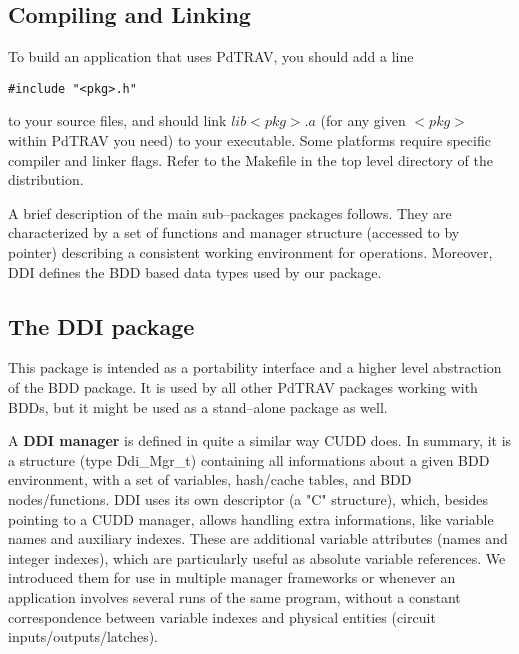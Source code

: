 \subsection{Compiling and Linking}
 
To build an application that uses PdTRAV, you should add 
a line 

\begin{verbatim}
#include "<pkg>.h" 
\end{verbatim}

to your source files, and should link $lib<pkg>.a$ (for any given
$<pkg>$ within PdTRAV you need) to your executable. 
Some platforms require specific compiler and linker flags.
Refer to the Makefile in the top level directory of the distribution. 

A brief description of the main sub--packages packages follows.
They are characterized by a set of functions and manager structure
(accessed to by pointer) describing a consistent working
environment for operations.
Moreover, DDI defines the BDD based data types used by our package.


\subsection{The DDI package}

This package is intended as a portability interface and a higher level 
abstraction of the BDD package. It is used by all other PdTRAV packages
working with BDDs, but it might be used as a stand--alone package as well.

A {\bf DDI manager} is defined in quite a similar way CUDD does. In summary,
it is a structure (type Ddi\_Mgr\_t)
containing all informations about a given BDD environment,
with a set of variables, hash/cache tables, and BDD nodes/functions.
DDI uses its own descriptor (a "C" structure), which, besides pointing to a CUDD manager,
allows handling extra informations, like variable names and auxiliary indexes.
These are additional variable attributes (names and integer indexes), which
are particularly useful as absolute variable references.
We introduced them for use in multiple manager frameworks or whenever an
application involves several runs of the same program, without a constant
correspondence between variable indexes and physical entities
(circuit inputs/outputs/latches).



